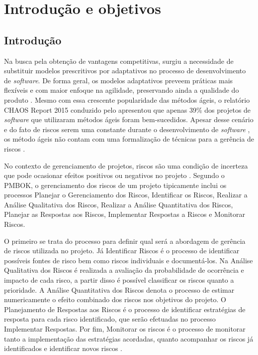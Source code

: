 \documentclass[
    12pt,       %
    openright,      %
    twoside,      %
    a4paper,      %
    english,      %
    french,       %
    spanish,      %
    brazil,       %
    ]{abntex2}
\begin{document}
\chapter{Introdução e objetivos}
\label{sec:Introducao}
\section{Introdução}

Na busca pela obtenção de vantagens competitivas, surgiu a necessidade de substituir modelos prescritivos por adaptativos no processo de desenvolvimento de \textit{software}. De forma geral, os modelos adaptativos preveem práticas mais flexíveis e com maior enfoque na agilidade, preservando ainda a qualidade do produto \cite{Rech:2013}. Mesmo com essa crescente popularidade das métodos ágeis, o relatório CHAOS Report 2015 conduzido pelo   apresentou que apenas 39\% dos projetos de \textit{software} que utilizaram métodos ágeis foram bem-sucedidos. Apesar desse cenário e do fato de riscos serem uma constante durante o desenvolvimento de \textit{software} \cite{Cunha:2013}, os método ágeis não contam com uma formalização de técnicas para a gerência de riscos \cite{Tomanek:2015}.

No contexto de gerenciamento de projetos, riscos são uma condição de incerteza que pode ocasionar efeitos positivos ou negativos no projeto \cite{PMBOK:2017}. Segundo o PMBOK, o gerenciamento dos riscos de um projeto tipicamente inclui os processos Planejar o Gerenciamento dos Riscos, Identificar os Riscos, Realizar a Análise Qualitativa dos Riscos, Realizar a Análise Quantitativa dos Riscos, Planejar as Respostas aos Riscos, Implementar Respostas a Riscos e Monitorar Riscos. 

O primeiro se trata do processo para definir qual será a abordagem de gerência de riscos utilizada no projeto. Já Identificar Riscos é o processo de identificar possíveis fontes de risco bem como riscos individuais e documentá-los. Na Análise Qualitativa dos Riscos é realizada a avaliação da probabilidade de ocorrência e impacto de cada risco, a partir disso é possível classificar os riscos quanto a prioridade. A Análise Quantitativa dos Riscos denota o processo de estimar numericamente o efeito combinado dos riscos nos objetivos do projeto. O Planejamento de Respostas aos Riscos é o processo de identificar estratégias de resposta para cada risco identificado, que serão efetuadas no processo Implementar Respostas. Por fim, Monitorar os riscos é o processo de monitorar tanto a implementação das estratégias acordadas, quanto acompanhar os riscos já identificados e identificar novos riscos \cite{PMBOK:2017}.
\end{document}
